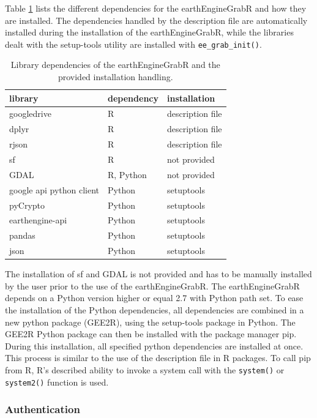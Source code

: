 Table \ref*{dependencies} lists the different dependencies for the earthEngineGrabR and how they are installed. 
The dependencies handled by the description file are automatically installed during the installation of the earthEngineGrabR, while the libraries dealt with the setup-tools utility are installed with \texttt{ee\_grab\_init()}.
\begin{table}[h]
		\caption{Library dependencies of the earthEngineGrabR and the provided installation handling.}
	\begin{tabularx}{\textwidth}{XXl}
		\toprule
		\textbf{library} & \textbf{dependency} & \textbf{installation}  \\
		\midrule
		googledrive & R  & description file  \\
		dplyr & R  & description file  \\
		rjson & R  & description file  \\
		sf & R  & not provided  \\
		GDAL & R, Python  & not provided  \\
		google api python client & Python  & setuptools  \\
		pyCrypto & Python  & setuptools  \\
		earthengine-api & Python  & setuptools  \\        
		pandas & Python  & setuptools  \\        
		json & Python  & setuptools  \\        
		\bottomrule
	\end{tabularx}

	\label{dependencies}
\end{table}
 The installation of sf and GDAL is not provided and has to be manually installed by the user prior to the use of the earthEngineGrabR. The earthEngineGrabR depends on a Python version higher or equal 2.7 with Python path set. To ease the installation of the Python dependencies, all dependencies are combined in a new python package (GEE2R), using the setup-tools package in Python. The GEE2R Python package can then be installed with the package manager pip. During this installation, all specified python dependencies are installed at once. This process is similar to the use of the description file in R packages. To call pip from R, R's described ability to invoke a system call with the \texttt{system()} or \texttt{system2()} function is used.

\subsubsection{Authentication}

